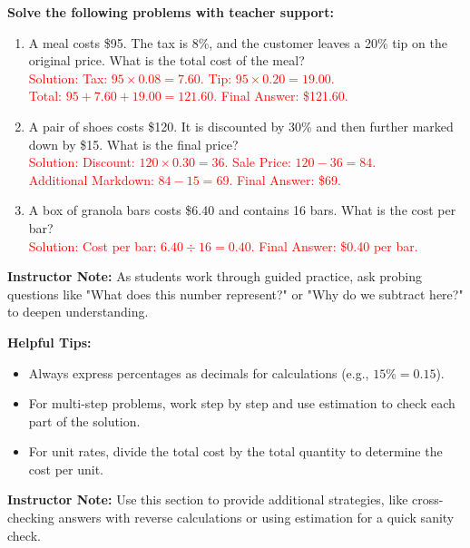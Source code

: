 \documentclass[12pt]{article}
\begin{document}
\vspace{1em}

\begin{tcolorbox}[colframe=black!60, colback=white, 
coltitle=black, colbacktitle=black!15, fonttitle=\bfseries\Large, 
title=Guided Practice, halign title=center, left=10pt, right=10pt, top=10pt, bottom=15pt]
\textbf{Solve the following problems with teacher support:}
\begin{enumerate}[itemsep=5em]
    \item A meal costs \$95. The tax is 8\%, and the customer leaves a 20\% tip on the original price. What is the total cost of the meal? \\
    \textcolor{red}{Solution: Tax: \( 95 \times 0.08 = 7.60 \). Tip: \( 95 \times 0.20 = 19.00 \). \\ Total: \( 95 + 7.60 + 19.00 = 121.60 \). Final Answer: \$121.60.}
    \item A pair of shoes costs \$120. It is discounted by 30\% and then further marked down by \$15. What is the final price? \\
    \textcolor{red}{Solution: Discount: \( 120 \times 0.30 = 36 \). Sale Price: \( 120 - 36 = 84 \). \\ Additional Markdown: \( 84 - 15 = 69 \). Final Answer: \$69.}
    \item A box of granola bars costs \$6.40 and contains 16 bars. What is the cost per bar? \\
    \textcolor{red}{Solution: Cost per bar: \( 6.40 \div 16 = 0.40 \). Final Answer: \$0.40 per bar.}
\end{enumerate}

{\color{blue} \textbf{Instructor Note:} As students work through guided practice, ask probing questions like "What does this number represent?" or "Why do we subtract here?" to deepen understanding.}
\end{tcolorbox}

\vspace{1em}

\begin{tcolorbox}[colframe=black!40, colback=gray!5, 
coltitle=black, colbacktitle=black!20, fonttitle=\bfseries\Large, 
title=Additional Notes, halign title=center, left=5pt, right=5pt, top=5pt, bottom=15pt]
\textbf{Helpful Tips:}
\begin{itemize}
    \item Always express percentages as decimals for calculations (e.g., \( 15\% = 0.15 \)).
    \item For multi-step problems, work step by step and use estimation to check each part of the solution.
    \item For unit rates, divide the total cost by the total quantity to determine the cost per unit.
\end{itemize}

{\color{blue} \textbf{Instructor Note:} Use this section to provide additional strategies, like cross-checking answers with reverse calculations or using estimation for a quick sanity check.}
\end{tcolorbox}
\end{document}
